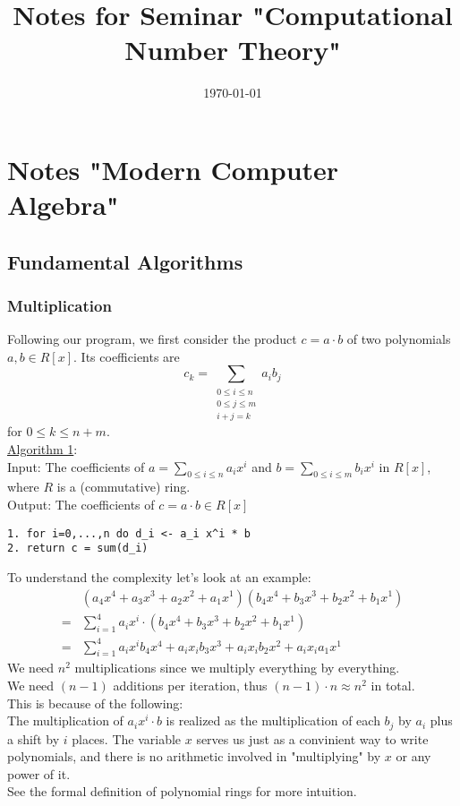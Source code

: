 \documentclass{article}
\title{Notes for Seminar "Computational Number Theory"}
\date{\today}
\begin{document}
\maketitle
\section{Notes "Modern Computer Algebra"}
\subsection{Fundamental Algorithms}
\subsubsection{Multiplication}
Following our program, we first consider the product $c = a \cdot b$ of two polynomials $a,b \in R[x]$. Its
coefficients are
\[
	c_k = \sum_{\substack{0 \leq i \leq n\\0 \leq j \leq m\\i+j=k}} a_ib_j
\]
for $0 \leq k \leq n+m$.\\
\underline{Algorithm 1}:\\
Input: The coefficients of $a = \sum_{0 \leq i \leq n} a_ix^i$ and $b=\sum_{0 \leq i \leq m} b_i x^i$ in $R[x]$,
where $R$ is a (commutative) ring.\\
Output: The coefficients of $c = a \cdot b \in R[x]$
\begin{verbatim}
1. for i=0,...,n do d_i <- a_i x^i * b
2. return c = sum(d_i)
\end{verbatim}
To understand the complexity let's look at an example:
\begin{align*}
	&(a_4 x^4 + a_3 x^3 + a_2 x^2 + a_1 x^1)(b_4 x^4 + b_3 x^3 + b_2 x^2 + b_1 x^1)\\
	=& \sum_{i=1}^4 a_i x^i \cdot (b_4 x^4 + b_3 x^3 + b_2 x^2 + b_1 x^1)\\
	=& \sum_{i=1}^4 a_i x^i b_4 x^4 + a_i x_i b_3 x^3 + a_i x_i b_2 x^2 + a_i x_i a_1 x^1
\end{align*}
We need $n^2$ multiplications since we multiply everything by everything.\\
We need $(n-1)$ additions per iteration, thus $(n-1)\cdot n \approx n^2$ in total.\\
This is because of the following:\\
The multiplication of $a_ix^i \cdot b$ is realized as the multiplication of each $b_j$ by $a_i$ plus a shift by $i$
places. The variable $x$ serves us just as a convinient way to write polynomials, and there is no arithmetic involved
in "multiplying" by $x$ or any power of it.\\
See the formal definition of polynomial rings for more intuition.
\end{document}
